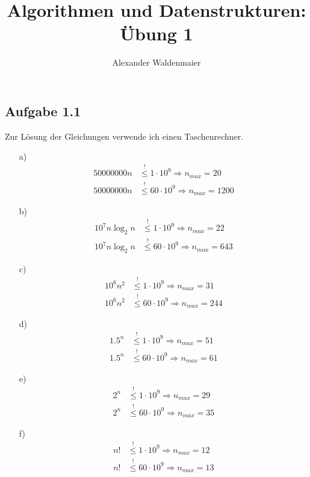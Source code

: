 \documentclass{article}
\title{Algorithmen und Datenstrukturen: Übung 1}
\author{Alexander Waldenmaier}
\begin{document}
    \maketitle

    \subsection*{Aufgabe 1.1}
    Zur Lösung der Gleichungen verwende ich einen Taschenrechner. 
    \begin{enumerate}
        \item[a)] 
        \begin{align*}
            50000000n &\stackrel{!}{\le} 1 \cdot 10^9 \Rightarrow n_{max} = 20 \\
            50000000n &\stackrel{!}{\le} 60 \cdot 10^9 \Rightarrow n_{max} = 1200
        \end{align*}
        \item[b)] 
        \begin{align*}
            10^7n \log_2n &\stackrel{!}{\le} 1 \cdot 10^9 \Rightarrow n_{max} = 22 \\
            10^7n \log_2n &\stackrel{!}{\le} 60 \cdot 10^9 \Rightarrow n_{max} = 643
        \end{align*} 
        \item[c)] 
        \begin{align*}
            10^6n^2 &\stackrel{!}{\le} 1 \cdot 10^9 \Rightarrow n_{max} = 31 \\
            10^6n^2 &\stackrel{!}{\le} 60 \cdot 10^9 \Rightarrow n_{max} = 244
        \end{align*} 
        \item[d)] 
        \begin{align*}
            1.5^n &\stackrel{!}{\le} 1 \cdot 10^9 \Rightarrow n_{max} = 51 \\
            1.5^n &\stackrel{!}{\le} 60 \cdot 10^9 \Rightarrow n_{max} = 61
        \end{align*}
        \item[e)] 
        \begin{align*}
            2^n &\stackrel{!}{\le} 1 \cdot 10^9 \Rightarrow n_{max} = 29 \\
            2^n &\stackrel{!}{\le} 60 \cdot 10^9 \Rightarrow n_{max} = 35
        \end{align*}
        \item[f)] 
        \begin{align*}
            n! &\stackrel{!}{\le} 1 \cdot 10^9 \Rightarrow n_{max} = 12 \\
            n! &\stackrel{!}{\le} 60 \cdot 10^9 \Rightarrow n_{max} = 13
        \end{align*}
    \end{enumerate}
\end{document}
